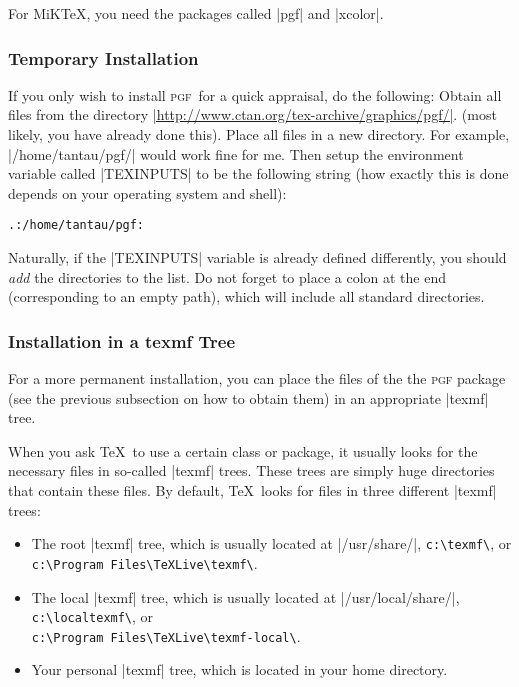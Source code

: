 \documentclass{ltxdoc}
\def\pgf{\textsc{pgf}}
\begin{document}
For MiK\TeX, you need the packages called |pgf| and |xcolor|. 



\subsubsection{Temporary Installation}

If you only wish to install \pgf\ for a quick appraisal, do
the following: Obtain all files from the directory
\href{http://www.ctan.org/tex-archive/graphics/pgf/}{|http://www.ctan.org/tex-archive/graphics/pgf/|}.
(most likely, you have already done this).
Place all files in a new directory. For example,
|/home/tantau/pgf/| would work fine for me. Then setup the
environment variable called |TEXINPUTS| to be the following
string (how exactly this is done  depends on your operating system and
shell):

\begin{verbatim}
.:/home/tantau/pgf:
\end{verbatim}

Naturally, if the |TEXINPUTS| variable is already defined
differently, you should \emph{add} the directories to the list. Do
not forget to place a colon at the end (corresponding to an empty
path), which will include all standard directories.



\subsubsection{Installation in a texmf Tree}

For a more permanent installation, you can place the files of the
the \textsc{pgf} package (see the previous subsection on how to obtain
them) in an appropriate |texmf| tree. 

When you ask \TeX\ to use a certain class or package, it usually looks
for the necessary files in so-called |texmf| trees. These trees
are simply huge directories that contain these files. By default,
\TeX\ looks for files in three different |texmf| trees:
\begin{itemize}
\item
  The root |texmf| tree, which is usually located at
  |/usr/share/|, \verb!c:\texmf\!, or\\
  \verb!c:\Program Files\TeXLive\texmf\!.
\item
  The local  |texmf| tree, which is usually located at
  |/usr/local/share/|, \verb!c:\localtexmf\!, or\\
  \verb!c:\Program Files\TeXLive\texmf-local\!.
\item
  Your personal  |texmf| tree, which is located in your home
  directory.   
\end{itemize}
\end{document}
